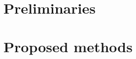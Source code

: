 %
%
%






\setlength{\parindent}{0pt}
\setlength{\parskip}{0pt} %
\frontmatter


\setcounter{page}{0}



{}


\tableofcontents

% 


\setlength{\parskip}{1em}


\mainmatter



\part{Preliminaries}





\part{Proposed methods}

